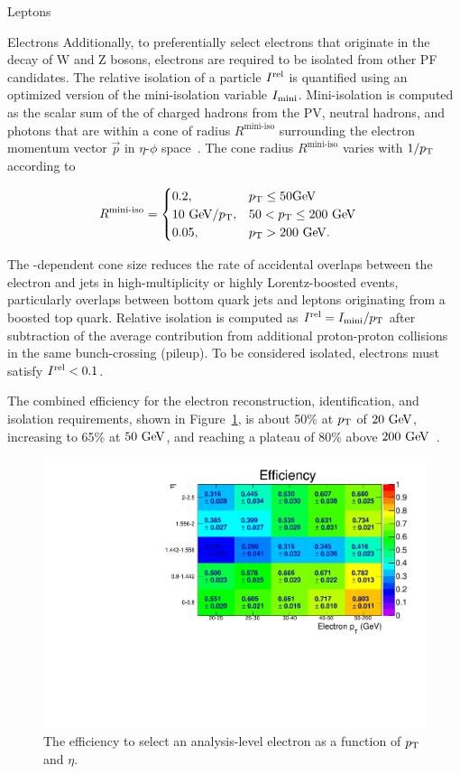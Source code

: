 \begin{section}{Leptons}
\begin{subsection}{Electrons}
Additionally, to preferentially select electrons that originate in the decay of W and Z bosons, electrons are required to be isolated from other PF candidates.
The relative isolation of a particle $I^{\mathrm{rel}}$ is quantified using an optimized version of the mini-isolation variable $I_{\mathrm{mini}}$.
Mini-isolation is computed as the scalar sum of the \pT of charged hadrons from the PV, neutral hadrons, and photons that are within a cone of radius $R^{\text{mini-iso}}$ surrounding the electron momentum vector $\vec{p}$ in $\eta$-$\phi$ space~\cite{Rehermann:2010vq}.
The cone radius $R^{\text{mini-iso}}$ varies with $1/p_\mathrm{T}$ according to

\begin{align}
R^{\text{mini-iso}} &=\begin{cases} 0.2, &
p_\mathrm{T} \leq 50\mathrm{Ge\kern -0.1em V} \\
{10~\mathrm{Ge\kern -0.1em V}}/{p_\mathrm{T}}, & 50 < p_\mathrm{T} \leq 200~\mathrm{Ge\kern -0.1em V} \\
0.05, & p_\mathrm{T} > 200~\mathrm{Ge\kern -0.1em V}.
\end{cases}\label{eqn:mini_iso_r}
\end{align}

The \pT-dependent cone size reduces the rate of accidental overlaps between the electron and jets in high-multiplicity or highly Lorentz-boosted events, particularly overlaps between bottom quark jets and leptons originating from a boosted top quark.
Relative isolation is computed as $I^{\mathrm{rel}} = I_{\mathrm{mini}}/p_\mathrm{T}$ after subtraction of the average contribution from additional proton-proton collisions in the same bunch-crossing (pileup).
To be considered isolated, electrons must satisfy $I^{\mathrm{rel}} < 0.1$.

The combined efficiency for the electron reconstruction, identification, and isolation requirements, shown in Figure~\ref{fig:electron_eff}, is about 50\% at $p_\mathrm{T}$ of $20~\mathrm{Ge\kern -0.1em V}$, increasing to 65\% at $50~\mathrm{Ge\kern -0.1em V}$, and reaching a plateau of 80\% above $200~\mathrm{Ge\kern -0.1em V}$~\cite{Khachatryan:2015hwa}.

\begin{figure}[tbp!]
\centering
\includegraphics[angle=0,width=0.80\columnwidth]{fig/electron_eff.pdf}
\caption{The efficiency to select an analysis-level electron as a function of $p_\mathrm{T}$ and $\eta$.}
\label{fig:electron_eff}
\end{figure}


\end{subsection}
\end{section}
